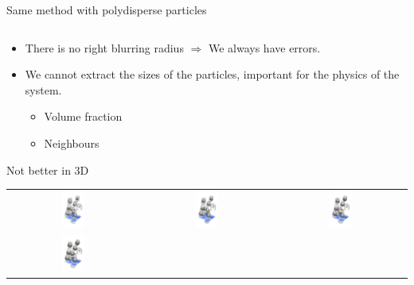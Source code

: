 \documentclass[xcolor=table]{beamer}
\begin{document}
\begin{frame}{Same method with polydisperse particles}
\begin{columns}[T]
	\end{columns}
	\begin{itemize}
	\item There is no \alert{right} blurring radius $\Rightarrow$ We always have errors.
	\item We cannot extract the sizes of the particles, important for the physics of the system.
	\begin{itemize}
		\item Volume fraction
		\item Neighbours
	\end{itemize}
	\end{itemize}
\end{frame}

\begin{frame}{Not better in 3D}
	\begin{center}
	\begin{tabular}{ccc}
	\includegraphics[width=0.18\textwidth]{comp3D_monoscale_r20_crop} & %
	\includegraphics[width=0.18\textwidth]{comp3D_monoscale_r25_crop} & %
	\includegraphics[width=0.18\textwidth]{comp3D_monoscale_r30_crop} \\ 
	\includegraphics[width=0.18\textwidth]{comp3D_monoscale_r35_crop} & %

\end{tabular}
\end{center}
\end{frame}
\end{document}
